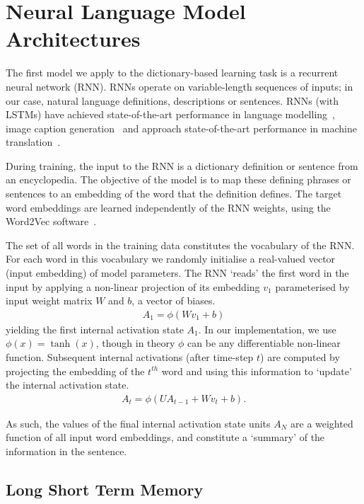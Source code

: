 \documentclass[11pt,letterpaper]{article}
\begin{document}
\section{Neural Language Model Architectures}

The first model we apply to the dictionary-based learning task is a recurrent neural network (RNN). RNNs operate on variable-length sequences of inputs; in our case, natural language definitions, descriptions or sentences. RNNs (with LSTMs) have achieved state-of-the-art performance in language modelling~\cite{mikolov2010recurrent}, image caption generation~\cite{kiros2014unifying} and approach state-of-the-art performance in machine translation~\cite{bahdanau2014neural}. 

During training, the input to the RNN is a dictionary definition or sentence from an encyclopedia. The objective of the model is to map these defining phrases or sentences to an embedding of the word that the definition defines. The target word embeddings are learned independently of the RNN weights, using the Word2Vec software~\cite{mikolov2013distributed}.   

The set of all words in the training data constitutes the vocabulary of the RNN. For each word in this vocabulary we randomly initialise a real-valued vector (input embedding) of model parameters. The RNN `reads' the first word in the input by applying a non-linear projection of its embedding \(v_1\) parameterised by input weight matrix \(W\) and \(b\), a vector of biases.
\begin{align*}
A_1 = \phi( Wv_1 + b) 
\end{align*}
yielding the first internal activation state \(A_1\). In our implementation, we
use \(\phi(x) = \tanh(x)\), though in theory \(\phi\) can be any differentiable
non-linear function. Subsequent internal activations (after time-step \(t\))
are computed by projecting the embedding of the \(t^{th}\) word and using this
information to `update' the internal activation state. 
\begin{align*}
A_t =  \phi( UA_{t-1} + Wv_t + b ). 
\end{align*}

As such, the values of the final internal activation state units \(A_N\) are a
weighted function of all input word embeddings, and constitute a `summary' of
the information in the sentence.

\subsection{Long Short Term Memory}
\end{document}
